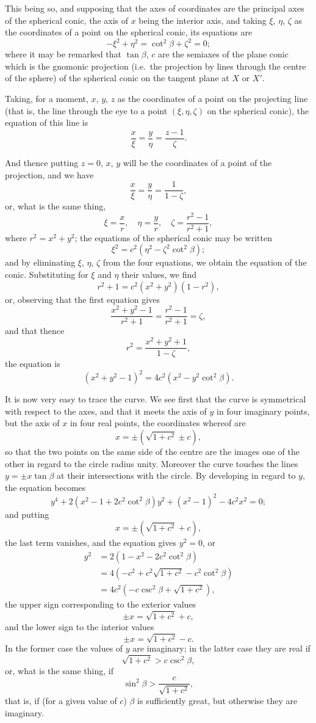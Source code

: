 \documentclass[11pt,a4paper]{article}
\begin{document}
This being so, and supposing that the axes of coordinates are the principal axes of the spherical conic, the axis of $x$ being the interior axis, and taking $\xi$, $\eta$, $\zeta$ as the coordinates of a point on the spherical conic, its equations are
\[
-\xi^2 + \eta^2 = \cot^2\beta + \zeta^2 = 0;
\]
where it may be remarked that $\tan\beta$, $c$ are the semiaxes of the plane conic which is the gnomonic projection (i.e.\ the projection by lines through the centre of the sphere) of the spherical conic on the tangent plane at $X$ or $X'$.

Taking, for a moment, $x$, $y$, $z$ as the coordinates of a point on the projecting line (that is, the line through the eye to a point $(\xi,\eta,\zeta)$ on the spherical conic), the equation of this line is
\[
\frac{x}{\xi} = \frac{y}{\eta} = \frac{z-1}{\zeta}.
\]

And thence putting $z=0$, $x$, $y$ will be the coordinates of a point of the projection, and we have
\[
\frac{x}{\xi} = \frac{y}{\eta} = \frac{1}{1-\zeta},
\]
or, what is the same thing,
\[
\xi = \frac{x}{r}, \quad \eta = \frac{y}{r}, \quad \zeta = \frac{r^2-1}{r^2+1},
\]
where $r^2 = x^2+y^2$; the equations of the spherical conic may be written
\[
\xi^2 = c^2(\eta^2-\zeta^2\cot^2\beta);
\]
and by eliminating $\xi$, $\eta$, $\zeta$ from the four equations, we obtain the equation of the conic. Substituting for $\xi$ and $\eta$ their values, we find
\[
r^2+1 = c^2(x^2+y^2)(1-r^2),
\]
or, observing that the first equation gives
\[
\frac{x^2+y^2-1}{r^2+1} = \frac{r^2-1}{r^2+1} = \zeta,
\]
and that thence
\[
r^2 = \frac{x^2+y^2+1}{1-\zeta},
\]
the equation is
\[
(x^2+y^2-1)^2 = 4c^2(x^2-y^2\cot^2\beta).
\]

It is now very easy to trace the curve. We see first that the curve is symmetrical with respect to the axes, and that it meets the axis of $y$ in four imaginary points, but the axis of $x$ in four real points, the coordinates whereof are
\[
x = \pm(\sqrt{1+c^2} \pm c),
\]
so that the two points on the same side of the centre are the images one of the other in regard to the circle radius unity. Moreover the curve touches the lines $y = \pm x\tan\beta$ at their intersections with the circle. By developing in regard to $y$, the equation becomes
\[
y^4 + 2(x^2-1+2c^2\cot^2\beta)y^2 + (x^2-1)^2 - 4c^2x^2 = 0;
\]
and putting
\[
x = \pm(\sqrt{1+c^2} + c),
\]
the last term vanishes, and the equation gives $y^2=0$, or
\begin{align*}
y^2 &= 2(1-x^2-2c^2\cot^2\beta) \\
&= 4(-c^2 + c^2\sqrt{1+c^2} - c^2\cot^2\beta) \\
&= 4c^2(-c\csc^2\beta + \sqrt{1+c^2}),
\end{align*}
the upper sign corresponding to the exterior values
\[
\pm x = \sqrt{1+c^2} + c,
\]
and the lower sign to the interior values
\[
\pm x = \sqrt{1+c^2} - c.
\]
In the former case the values of $y$ are imaginary; in the latter case they are real if
\[
\sqrt{1+c^2} > c\csc^2\beta,
\]
or, what is the same thing, if
\[
\sin^2\beta > \frac{c}{\sqrt{1+c^2}},
\]
that is, if (for a given value of $c$) $\beta$ is sufficiently great, but otherwise they are imaginary.
\end{document}
